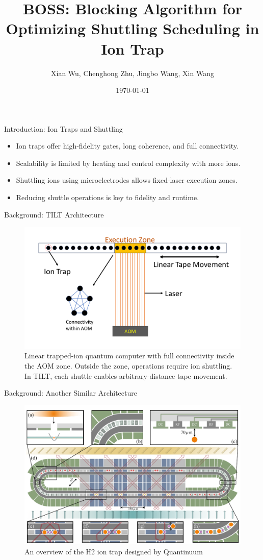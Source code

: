 \documentclass{beamer}
\title[BOSS: Optimizing Shuttling]{BOSS: Blocking Algorithm for Optimizing Shuttling Scheduling in Ion Trap}
\author{Xian Wu, Chenghong Zhu, Jingbo Wang, Xin Wang}
\institute{HKUST (GZ) and BAQIS}
\date{\today}
\begin{document}
	
	\begin{frame}
		\titlepage
	\end{frame}
	
	\begin{frame}{Introduction: Ion Traps and Shuttling}
		\begin{itemize}
			\item Ion traps offer high-fidelity gates, long coherence, and full connectivity.
			\item Scalability is limited by heating and control complexity with more ions.
			\item Shuttling ions using microelectrodes allows fixed-laser execution zones.
			\item Reducing shuttle operations is key to fidelity and runtime.
		\end{itemize}
	\end{frame}
	
	\begin{frame}{Background: TILT Architecture}
		\begin{figure}
			\includegraphics[width=.8\textwidth]{figure/TILT_laser.pdf}
			\caption[]{Linear trapped-ion quantum computer with full connectivity inside the AOM zone. Outside the zone, operations require ion shuttling. In TILT, each shuttle enables arbitrary-distance tape movement.}
		\end{figure}
	\end{frame}
	
	\begin{frame}{Background: Another Similar Architecture}
		\begin{figure}
			\includegraphics[width=.8\textwidth]{figure/h2_benchmarking_figure.pdf}
			\caption[]{An overview of the H2 ion trap designed by Quantinuum}
		\end{figure}
	\end{frame}
	
\end{document}
